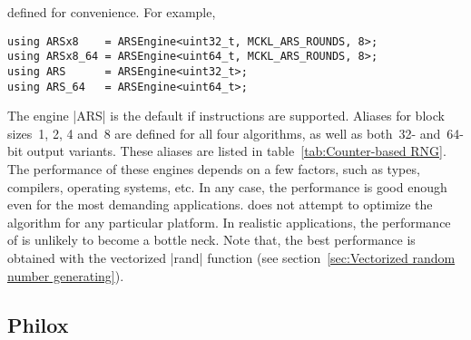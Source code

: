 defined for convenience. For example,
\begin{verbatim}
using ARSx8    = ARSEngine<uint32_t, MCKL_ARS_ROUNDS, 8>;
using ARSx8_64 = ARSEngine<uint64_t, MCKL_ARS_ROUNDS, 8>;
using ARS      = ARSEngine<uint32_t>;
using ARS_64   = ARSEngine<uint64_t>;
\end{verbatim}
The engine |ARS| is the default \rng if \aesni instructions are supported.
Aliases for block sizes~1, 2, 4 and~8 are defined for all four algorithms, as
well as both~32- and~64-bit output variants. These aliases are listed in
table~\ref{tab:Counter-based RNG}. The performance of these engines depends on
a few factors, such as \cpu types, compilers, operating systems, etc. In any
case, the performance is good enough even for the most demanding applications.
\mckl does not attempt to optimize the algorithm for any particular platform.
In realistic applications, the performance of \rng is unlikely to become a
bottle neck. Note that, the best performance is obtained with the vectorized
|rand| function (see section~\ref{sec:Vectorized random number generating}).

\subsection{Philox}
\label{sub:Philox}

